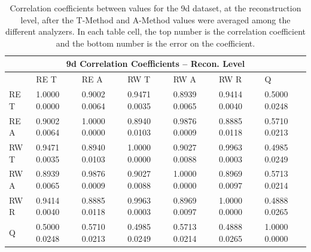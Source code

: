 \begin{table}
\setlength\tabcolsep{15pt}
\footnotesize
\centering
\renewcommand{\arraystretch}{1.4}
\begin{tabularx}{0.8\linewidth}{@{\extracolsep{\fill}}lXXXXXX}
  \toprule
  	\multicolumn{7}{c}{{\normalsize 9d Correlation Coefficients -- Recon. Level}} \\
  \midrule
  	       & RE T & RE A & RW T & RW A & RW R & \quad Q \\
  \midrule
	RE T   & 1.0000 0.0000 & 0.9002 0.0064 & 0.9471 0.0035 & 0.8939 0.0065 & 0.9414 0.0040 & 0.5000 0.0248  \\
	RE A   & 0.9002 0.0064 & 1.0000 0.0000 & 0.8940 0.0103 & 0.9876 0.0009 & 0.8885 0.0118 & 0.5710 0.0213  \\
	RW T   & 0.9471 0.0035 & 0.8940 0.0103 & 1.0000 0.0000 & 0.9027 0.0088 & 0.9963 0.0003 & 0.4985 0.0249  \\
	RW A   & 0.8939 0.0065 & 0.9876 0.0009 & 0.9027 0.0088 & 1.0000 0.0000 & 0.8969 0.0097 & 0.5713 0.0214  \\
	RW R   & 0.9414 0.0040 & 0.8885 0.0118 & 0.9963 0.0003 & 0.8969 0.0097 & 1.0000 0.0000 & 0.4888 0.0265  \\
	Q      & 0.5000 0.0248 & 0.5710 0.0213 & 0.4985 0.0249 & 0.5713 0.0214 & 0.4888 0.0265 & 1.0000 0.0000  \\
  \bottomrule
\end{tabularx}
\caption[]{Correlation coefficients between \R values for the 9d dataset, at the reconstruction level, after the \RW T-Method and A-Method \R values were averaged among the different analyzers. In each table cell, the top number is the correlation coefficient and the bottom number is the error on the coefficient.}
\label{tab:Corrs_9d_recon}
\end{table}


